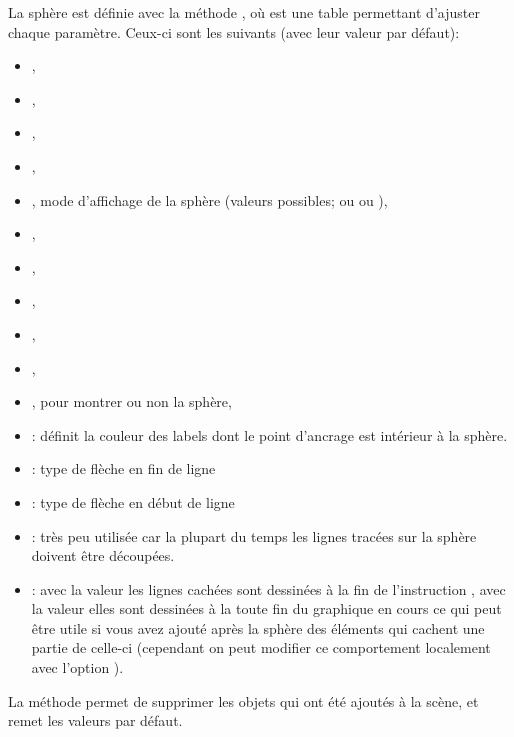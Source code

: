 La sphère est définie avec la méthode , où  est une table permettant d'ajuster chaque paramètre. Ceux-ci sont les suivants (avec leur valeur par défaut):

\begin{itemize}
    \item {},
    \item {},
    \item {},
    \item {},
    \item {}, mode d'affichage de la sphère (valeurs possibles;  ou  ou ),
    \item {},
    \item {},
    \item {},
    \item {},
    \item {},
    \item {}, pour montrer ou non la sphère,
    \item {} : définit la couleur des labels dont le point d'ancrage est intérieur à la sphère.
    \item {} : type de flèche en fin de ligne
    \item {} : type de flèche en début de ligne
    \item {} : très peu utilisée car la plupart du temps les lignes tracées sur la sphère doivent être découpées.
    \item {}: avec la valeur \false les lignes cachées sont dessinées à la fin de l'instruction , avec la valeur \true elles sont dessinées à la toute fin du graphique en cours ce qui peut être utile si vous avez ajouté après la sphère des éléments qui cachent une partie de celle-ci (cependant on peut modifier ce comportement localement avec l'option ).
\end{itemize}

La méthode  permet de supprimer les objets qui ont été ajoutés à la scène, et remet les valeurs par défaut.


